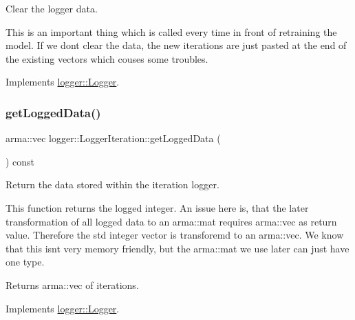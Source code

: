 Clear the logger data. 

This is an important thing which is called every time in front of retraining the model. If we don\textquotesingle{}t clear the data, the new iterations are just pasted at the end of the existing vectors which couses some troubles. 

Implements \hyperlink{classlogger_1_1_logger_a8c68db2430fa84b67528bfa6ae45a516}{logger\+::\+Logger}.

\mbox{\label{classlogger_1_1_logger_iteration_a2d0404feb799850420874612a435f3da}} 
\subsubsection{\texorpdfstring{get\+Logged\+Data()}{getLoggedData()}}
{\footnotesize\ttfamily arma\+::vec logger\+::\+Logger\+Iteration\+::get\+Logged\+Data (\begin{DoxyParamCaption}{ }\end{DoxyParamCaption}) const\hspace{0.3cm}{\ttfamily [virtual]}}



Return the data stored within the iteration logger. 

This function returns the logged integer. An issue here is, that the later transformation of all logged data to an {\ttfamily arma\+::mat} requires {\ttfamily arma\+::vec} as return value. Therefore the std integer vector is transforemd to an {\ttfamily arma\+::vec}. We know that this isn\textquotesingle{}t very memory friendly, but the {\ttfamily arma\+::mat} we use later can just have one type.

\begin{DoxyReturn}{Returns}
{\ttfamily arma\+::vec} of iterations. 
\end{DoxyReturn}


Implements \hyperlink{classlogger_1_1_logger_aa4fc254c532172db3404b7c0bcd17092}{logger\+::\+Logger}.

\mbox{\label{classlogger_1_1_logger_iteration_a155e7fd8c8130211f54804c5ff3a054b}} 
